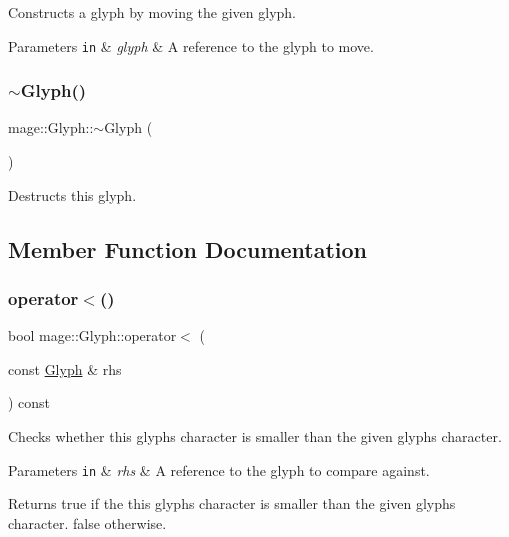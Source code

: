 Constructs a glyph by moving the given glyph.


\begin{DoxyParams}[1]{Parameters}
\mbox{\tt in}  & {\em glyph} & A reference to the glyph to move. \\
\hline
\end{DoxyParams}
\hypertarget{structmage_1_1_glyph_aa8e903334e77cc2930149923461d06ab}{}\label{structmage_1_1_glyph_aa8e903334e77cc2930149923461d06ab} 
\subsubsection{\texorpdfstring{$\sim$\+Glyph()}{~Glyph()}}
{\footnotesize\ttfamily mage\+::\+Glyph\+::$\sim$\+Glyph (\begin{DoxyParamCaption}{ }\end{DoxyParamCaption})\hspace{0.3cm}{\ttfamily [default]}}

Destructs this glyph. 

\subsection{Member Function Documentation}
\hypertarget{structmage_1_1_glyph_a7bb41307f74973e4bc547193dedc8dcc}{}\label{structmage_1_1_glyph_a7bb41307f74973e4bc547193dedc8dcc} 
\subsubsection{\texorpdfstring{operator$<$()}{operator<()}\hspace{0.1cm}{\footnotesize\ttfamily [1/2]}}
{\footnotesize\ttfamily bool mage\+::\+Glyph\+::operator$<$ (\begin{DoxyParamCaption}\item[{const \hyperlink{structmage_1_1_glyph}{Glyph} \&}]{rhs }\end{DoxyParamCaption}) const\hspace{0.3cm}{\ttfamily [noexcept]}}

Checks whether this glyph\textquotesingle{}s character is smaller than the given glyph\textquotesingle{}s character.


\begin{DoxyParams}[1]{Parameters}
\mbox{\tt in}  & {\em rhs} & A reference to the glyph to compare against. \\
\hline
\end{DoxyParams}
\begin{DoxyReturn}{Returns}
{\ttfamily true} if the this glyph\textquotesingle{}s character is smaller than the given glyph\textquotesingle{}s character. {\ttfamily false} otherwise. 
\end{DoxyReturn}
\hypertarget{structmage_1_1_glyph_ad8e9835022217afef429f38891bba80e}{}\label{structmage_1_1_glyph_ad8e9835022217afef429f38891bba80e} 
